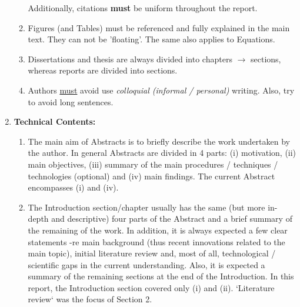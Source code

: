 \documentclass[14pt,twoside]{report}
\begin{document}
\begin{enumerate}
\begin{enumerate}
                       Additionally, citations {\bf must} be uniform throughout the report.
                       \item Figures (and Tables) must be referenced and fully explained in the main text. They can not be 'floating'. The same also applies to Equations.
                         \item Dissertations and thesis are always divided into chapters $\rightarrow$ sections, whereas reports are divided into sections.
                       \item Authors \underline{must} avoid use {\it colloquial (informal / personal)} writing. Also, try to avoid long sentences.
                \end{enumerate}
%
    \item {\bf Technical Contents:}
                \begin{enumerate}
                   \item The main aim of Abstracts is to briefly describe the work undertaken by the author. In general Abstracts are divided in 4 parts: (i) motivation, (ii) main objectives, (iii) summary of the main procedures / techniques / technologies (optional) and (iv) main findings. The current Abstract encompasses (i) and (iv).
                   \item The Introduction section/chapter usually has the same (but more in-depth and descriptive) four parts of the Abstract and a brief summary of the remaining of the work. In addition, it is always expected a few clear statements -re main background (thus recent innovations related to the main topic), initial literature review and, most of all, technological / scientific gaps in the current understanding. Also, it is expected a summary of the remaining sections at the end of the Introduction. In this report, the Introduction section covered only (i) and (ii). `Literature review` was the focus of Section 2.

\end{enumerate}
\end{enumerate}
\end{document}
